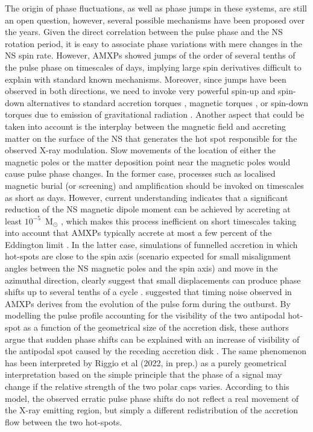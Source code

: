 \documentclass[fleqn,usenatbib]{mnras}
\begin{document}
The origin of phase fluctuations, as well as phase jumps in these systems, are still an open question, however, several possible mechanisms have been proposed over the years. Given the direct correlation between the pulse phase and the NS rotation period, it is easy to associate phase variations with mere changes in the NS spin rate. However, AMXPs showed jumps of the order of several tenths of the pulse phase on timescales of days, implying large spin derivatives difficult to explain with standard known mechanisms. Moreover, since jumps have been observed in both directions, we need to invoke very powerful spin-up and spin-down alternatives to standard accretion torques \citep[see e.g.,][]{Lamb:1978uf,Ghosh:1979ws}, magnetic torques \citep[see e.g.,][]{Wang95,Rappaport:2004tr,Kluzniak07}, or spin-down torques due to emission of gravitational radiation \citep[see e.g.,][]{Bildsten:1998wb}.
Another aspect that could be taken into account is the interplay between the magnetic field and accreting matter on the surface of the NS that generates the hot spot responsible for the observed X-ray modulation. Slow movements of the location of either the magnetic poles or the matter deposition point near the magnetic poles would cause pulse phase changes. In the former case, processes such as localised magnetic burial (or screening) and amplification should be invoked on timescales as short as days. However, current understanding indicates that a significant reduction of the NS magnetic dipole moment can be achieved by accreting at least $10^{-5}$~M$_\odot$ \citep{Payne:2004wj}, which makes this process inefficient on short timescales taking into account that AMXPs typically accrete at most a few percent of the Eddington limit \citep[see e.g.,][]{Di-Salvo:2020va,Patruno:2021vs}. In the latter case, simulations of funnelled accretion in which hot-spots are close to the spin axis (scenario expected for small misalignment angles between the NS magnetic poles and the spin axis) and move in the azimuthal direction, clearly suggest that small displacements can produce phase shifts up to several tenths of a cycle \citep[see e.g.,][and references therein]{Lamb:2009wf}.     
\citet{Poutanen:2009wb} suggested that timing noise observed in AMXPs derives from the evolution of the pulse form during the outburst. By modelling the pulse profile accounting for the visibility of the two antipodal hot-spot as a function of the geometrical size of the accretion disk, these authors argue that sudden phase shifts can be explained with an increase of visibility of the antipodal spot caused by the receding accretion disk \textbf{\citep[see e.g., the 2002 outburst of SAX J1808.4$-$3658;][]{Poutanen:2009wb}}. The same phenomenon has been interpreted by Riggio et al (2022, in prep.) as a purely geometrical interpretation based on the simple principle that the phase of a signal may change if the relative strength of the two polar caps varies. According to this model, the observed erratic pulse phase shifts do not reflect a real movement of the X-ray emitting region, but simply a different redistribution of the accretion flow between the two hot-spots.
\end{document}
